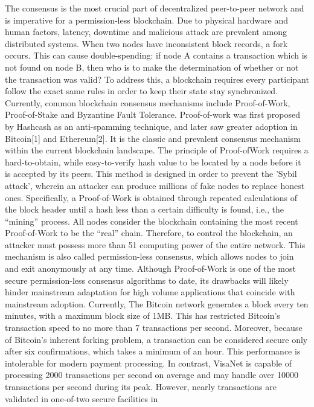     The consensus is the most crucial part of decentralized peer-to-peer network and is
imperative for a permission-less blockchain. Due to physical hardware and human factors,
latency, downtime and malicious attack are prevalent among distributed systems. When
two nodes have inconsistent block records, a fork occurs. This can cause double-spending: if
node A contains a transaction which is not found on node B, then who is to make the
determination of whether or not the transaction was valid? To address this, a blockchain
requires every participant follow the exact same rules in order to keep their state stay
synchronized. Currently, common blockchain consensus mechanisms include Proof-of-Work,
Proof-of-Stake and Byzantine Fault Tolerance. 
Proof-of-work was first proposed by Hashcash as an anti-spamming technique, and
later saw greater adoption in Bitcoin[1] and Ethereum[2]. It is the classic and prevalent
consensus mechanism within the current blockchain landscape. The principle of Proof-ofWork
requires a hard-to-obtain, while easy-to-verify hash value to be located by a node
before it is accepted by its peers. This method is designed in order to prevent the 'Sybil
attack', wherein an attacker can produce millions of fake nodes to replace honest ones.
Specifically, a Proof-of-Work is obtained through repeated calculations of the block header
until a hash less than a certain difficulty is found, i.e., the “mining” process. All nodes
consider the blockchain containing the most recent Proof-of-Work to be the “real” chain.
Therefore, to control the blockchain, an attacker must possess more than 51%
computing power of the entire network. This mechanism is also called permission-less
consensus, which allows nodes to join and exit anonymously at any time.
Although Proof-of-Work is one of the most secure permission-less consensus algorithms
to date, its drawbacks will likely hinder mainstream adaptation for high volume
applications that coincide with mainstream adoption. Currently, The Bitcoin network
generates a block every ten minutes, with a maximum block size of 1MB. This has
restricted Bitcoin’s transaction speed to no more than 7 transactions per second. Moreover,
because of Bitcoin’s inherent forking problem, a transaction can be considered secure only
after six confirmations, which takes a minimum of an hour. This performance is intolerable
for modern payment processing. In contrast, VisaNet is capable of processing 2000
transactions per second on average and may handle over 10000 transactions per second
during its peak. However, nearly transactions are validated in one-of-two secure facilities in
